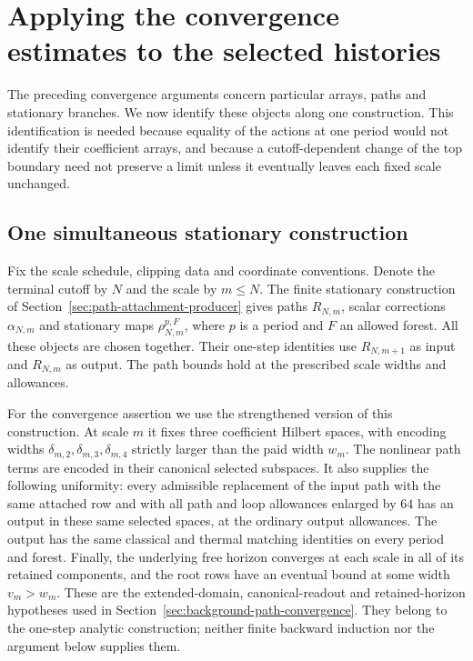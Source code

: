 \section{Applying the convergence estimates to the selected histories}
\label{sec:selected-history-limits}
The preceding convergence arguments concern particular arrays, paths and
stationary branches. We now identify these objects along one construction.
This identification is needed because equality of the actions at one
period would not identify their coefficient arrays, and because a
cutoff-dependent change of the top boundary need not preserve a limit
unless it eventually leaves each fixed scale unchanged.

\subsection{One simultaneous stationary construction}
Fix the scale schedule, clipping data and coordinate conventions. Denote
the terminal cutoff by $N$ and the scale by $m\le N$. The finite
stationary construction of Section~\ref{sec:path-attachment-producer}
gives paths $R_{N,m}$, scalar corrections $\alpha_{N,m}$ and stationary
maps $\rho_{N,m}^{p,F}$, where $p$ is a period and $F$ an allowed forest.
All these objects are chosen together. Their one-step identities use
$R_{N,m+1}$ as input and $R_{N,m}$ as output. The path bounds hold at
the prescribed scale widths and allowances.

For the convergence assertion we use the strengthened version of this
construction. At scale $m$ it fixes three coefficient Hilbert spaces,
with encoding widths $\delta_{m,2},\delta_{m,3},\delta_{m,4}$ strictly
larger than the paid width $w_m$. The nonlinear path terms are encoded
in their canonical selected subspaces. It also supplies the following
uniformity: every admissible replacement of the input path with the
same attached row and with all path and loop allowances enlarged by
$64$ has an output in these same selected spaces, at the ordinary
output allowances. The output has the same classical and thermal
matching identities on every period and forest. Finally, the underlying
free horizon converges at each scale in all of its retained components,
and the root rows have an eventual bound at some width $v_m>w_m$.
These are the extended-domain, canonical-readout and retained-horizon
hypotheses used in Section~\ref{sec:background-path-convergence}.
They belong to the one-step analytic construction; neither finite
backward induction nor the argument below supplies them.

